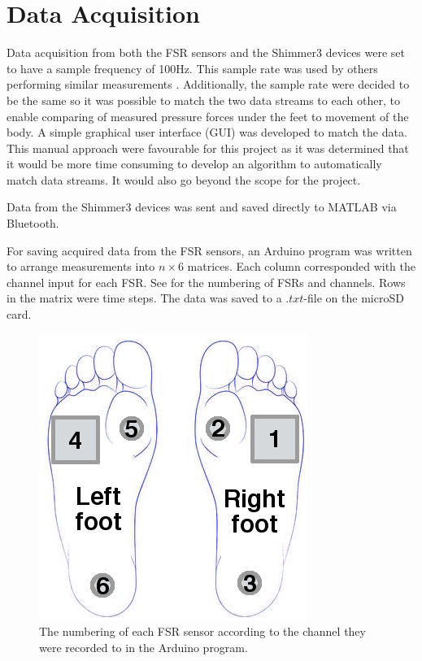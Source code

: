 \section{Data Acquisition}

Data acquisition from both the FSR sensors and the Shimmer3 devices were set to have a sample frequency of 100Hz. This sample rate was used by others performing similar measurements \cite{Verkerke2005, Byun2016, Sherwani2016}. Additionally, the sample rate were decided to be the same so it was possible to match the two data streams to each other, to enable comparing of measured pressure forces under the feet to movement of the body. A simple graphical user interface (GUI) was developed to match the data. This manual approach were favourable for this project as it was determined that it would be more time consuming to develop an algorithm to automatically match data streams. It would also go beyond the scope for the project.

Data from the Shimmer3 devices was sent and saved directly to MATLAB via Bluetooth.%

For saving acquired data from the FSR sensors, an Arduino program was written to arrange measurements into $n\times6$ matrices. Each column corresponded with the channel input for each FSR. See  for the numbering of FSRs and channels. Rows in the matrix were time steps. The data was saved to a $.txt$-file on the microSD card. 

\begin{figure}[H]
	\includegraphics[width=.3\textwidth]{figures/FSRNumbering}
	\caption{The numbering of each FSR sensor according to the channel they were recorded to in the Arduino program.}
	\label{fig:FSRNumbering}  %
\end{figure}



